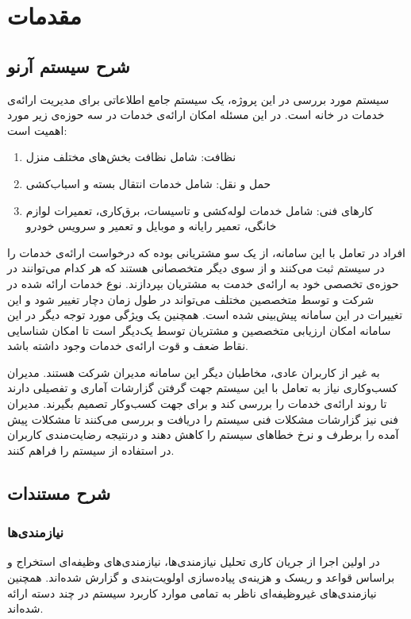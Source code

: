 
\chapter{مقدمات}

\section{شرح سیستم آرنو}

سیستم مورد بررسی در این پروژه، ‌یک سیستم جامع اطلاعاتی برای مدیریت ارائه‌ی خدمات در خانه است. 
در این مسئله امکان ارائه‌ی خدمات در سه حوزه‌ی زیر مورد اهمیت است:

\begin{enumerate}
	\item
	نظافت: شامل نظافت بخش‌های مختلف منزل 
	\item
	حمل و نقل: شامل خدمات انتقال بسته و اسباب‌کشی
	\item 
	کارهای فنی: شامل خدمات لوله‌کشی و تاسیسات، برق‌کاری، تعمیرات لوازم خانگی، تعمیر رایانه و موبایل و تعمیر و سرویس خودرو
	
\end{enumerate}

افراد در تعامل با این سامانه، از یک سو مشتریانی بوده که درخواست ارائه‌ی خدمات را در سیستم ثبت می‌کنند و از سوی دیگر متخصصانی هستند که هر کدام می‌توانند در حوزه‌ی تخصصی خود به ارائه‌ی خدمت به مشتریان بپردازند. نوع خدمات ارائه شده در شرکت و توسط متخصصین مختلف می‌تواند در طول زمان دچار تغییر شود و این تغییرات در این سامانه پیش‌بینی شده است. همچنین یک ویژگی مورد توجه دیگر در این سامانه امکان ارزیابی متخصصین و مشتریان توسط یک‌دیگر است تا امکان شناسایی نقاط ضعف و قوت ارائه‌ی خدمات وجود داشته باشد.

به غیر از کاربران عادی، مخاطبان دیگر این سامانه مدیران شرکت هستند. مدیران کسب‌وکاری نیاز به تعامل با این سیستم جهت گرفتن گزارشات آماری و تفصیلی دارند تا روند ارائه‌ی خدمات را بررسی کند و برای جهت کسب‌و‌کار تصمیم بگیرند. مدیران فنی نیز گزارشات مشکلات فنی سیستم را دریافت و بررسی می‌کنند تا مشکلات پیش آمده را برطرف و نرخ خطاهای سیستم را کاهش دهند و درنتیجه رضایت‌مندی کاربران در استفاده از سیستم را فراهم کنند.


\section{شرح مستندات}
\subsection{نیازمندی‌ها}
در اولین اجرا از جریان کاری تحلیل نیازمندی‌ها، نیازمندی‌های وظیفه‌ای استخراج و براساس قواعد  و ریسک و هزینه‌ی پیاده‌سازی اولویت‌بندی و گزارش شده‌اند. همچنین نیازمندی‌های غیروظیفه‌ای ناظر به تمامی موارد کاربرد سیستم در چند دسته ارائه شده‌اند.
